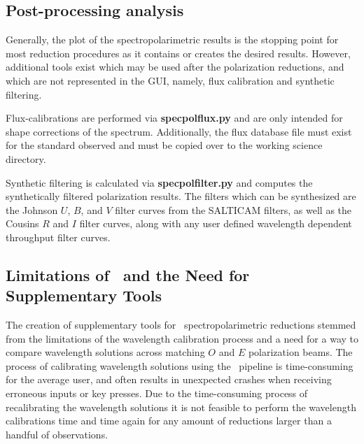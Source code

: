 \subsection{Post-processing analysis}

Generally, the plot of the spectropolarimetric results is the stopping point for most reduction procedures as it contains or creates the desired results. However, additional tools exist which may be used after the polarization reductions, and which are not represented in the \gls{GUI}, namely, flux calibration and synthetic filtering.

Flux-calibrations are performed via \textbf{specpolflux.py} and are only intended for shape corrections of the spectrum. Additionally, the flux database file must exist for the standard observed and must be copied over to the working science directory.

Synthetic filtering is calculated via \textbf{specpolfilter.py} and computes the synthetically filtered polarization results. The filters which can be synthesized are the Johnson $U$, $B$, and $V$ filter curves from the \gls{SALTICAM} filters, as well as the Cousins $R$ and $I$ filter curves, along with any user defined wavelength dependent throughput filter curves.

\subsection{Limitations of \polsalt\ and the Need for Supplementary Tools} \label{subsec:polsalt_limits}

The creation of supplementary tools for \polsalt\ spectropolarimetric reductions stemmed from the limitations of the wavelength calibration process and a need for a way to compare wavelength solutions across matching $O$ and $E$ polarization beams. The process of calibrating wavelength solutions using the \polsalt\ pipeline is time-consuming for the average user, and often results in unexpected crashes when receiving erroneous inputs or key presses. Due to the time-consuming process of recalibrating the wavelength solutions it is not feasible to perform the wavelength calibrations time and time again for any amount of reductions larger than a handful of observations.

